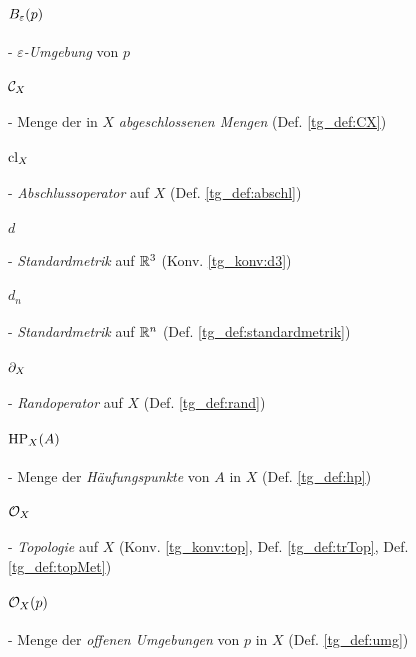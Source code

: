     
    \paragraph{$B_\varepsilon(p)$} - \quad \textit{$\varepsilon$-Umgebung} von $p$

    \paragraph{$\mathcal{C}_X$} - \quad Menge der in $X$ \textit{abgeschlossenen Mengen} (Def. \ref{tg_def:CX})

    \paragraph{$\text{cl}_X$} - \quad \textit{Abschlussoperator} auf $X$ (Def. \ref{tg_def:abschl})

    \paragraph{$d$} - \quad \textit{Standardmetrik} auf $\mathbb{R}^3$ (Konv. \ref{tg_konv:d3})
    
    \paragraph{$d_n$} - \quad \textit{Standardmetrik} auf $\mathbb{R}^n$ (Def. \ref{tg_def:standardmetrik})
    
    \paragraph{$\partial_X$} - \quad \textit{Randoperator} auf $X$ (Def. \ref{tg_def:rand})

    \paragraph{$\text{HP}_X(A)$} - \quad Menge der \textit{Häufungspunkte} von $A$ in $X$ (Def. \ref{tg_def:hp})
 
    \paragraph{$\mathcal{O}_X$} - \quad \textit{Topologie} auf $X$ (Konv. \ref{tg_konv:top}, Def. \ref{tg_def:trTop}, Def. \ref{tg_def:topMet})

    \paragraph{$\mathcal{O}_X(p)$} - \quad Menge der \textit{offenen Umgebungen} von $p$ in $X$ (Def. \ref{tg_def:umg})

